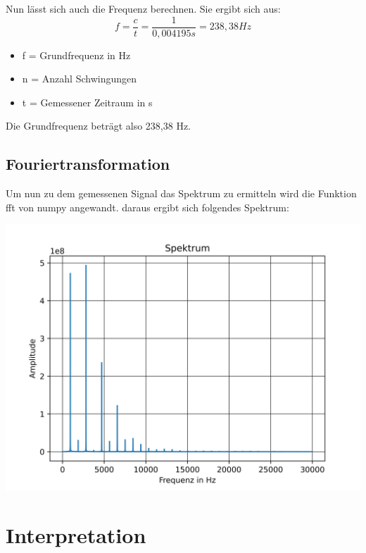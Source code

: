 Nun lässt sich auch die Frequenz berechnen. 
Sie ergibt sich aus:
\begin{equation}
	f =  \frac{c}{t} = \frac{1}{0,004195 s} = 238,38 Hz
\end{equation}
\begin{itemize}
	\item f = Grundfrequenz in Hz 
	\item n = Anzahl Schwingungen
	\item t = Gemessener Zeitraum in s
\end{itemize}

Die Grundfrequenz beträgt also 238,38 Hz.

\subsection*{Fouriertransformation}

Um nun zu dem gemessenen Signal das Spektrum zu ermitteln wird die Funktion fft von numpy angewandt.
daraus ergibt sich folgendes Spektrum:

\includegraphics[scale=0.5]{media/Fouriertranformierte.png}

\section{Interpretation}
\label{chap:VERSUCH_1_INTERPRETATION}


